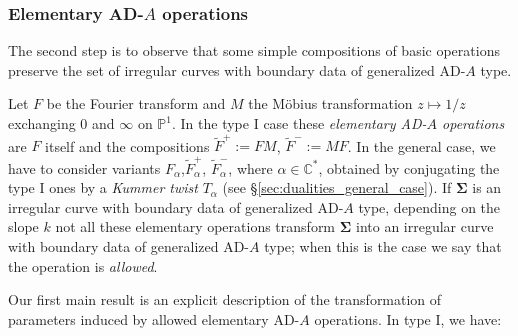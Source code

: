 \documentclass[11pt,a4paper]{amsart}
\numberwithin{equation}{section}
\begin{document}
\subsubsection{Elementary AD-$A$ operations}


The second step is to observe that some simple compositions of basic operations preserve the set of irregular curves with boundary data of generalized AD-$A$ type.

Let $F$ be the Fourier transform and $M$ the Möbius transformation $z\mapsto 1/z$ exchanging $0$ and $\infty$ on $\mathbb P^1$. In the type I case these \emph{elementary AD-$A$ operations} are $F$ itself and the compositions $\widetilde F^+:=FM$, $\widetilde F^-:=MF$. In the general case, we have to consider variants $F_\alpha$,$\widetilde F^+_\alpha$, $\widetilde F^-_\alpha$, where $\alpha\in \mathbb C^*$, obtained by conjugating the type I ones by a \emph{Kummer twist} $T_\alpha$ (see §\ref{sec:dualities_general_case}). 
If $\bm\Sigma$ is an irregular curve with boundary data of generalized AD-$A$ type, depending on the slope $k$ not all these elementary operations transform $\bm\Sigma$ into an irregular curve with boundary data of generalized AD-$A$ type; when this is the case we say that the operation is \emph{allowed}.

Our first main result is an explicit description of the transformation of parameters induced by allowed elementary AD-$A$ operations. In type I, we have:
\end{document}
